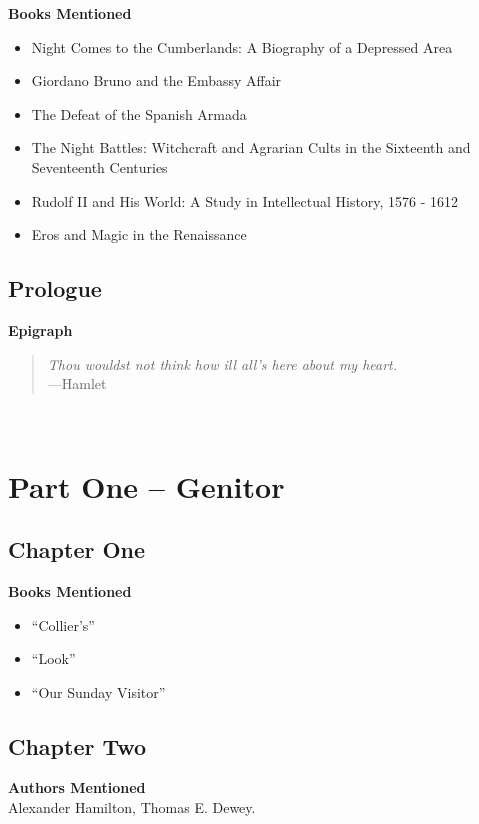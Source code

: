 \documentclass[twoside,10pt]{report}
\newcommand\fleuron{\begin{turn}{45}\Large \ding{166}\end{turn}}
\newcommand\doublefleuron{%
	\reflectbox{\fleuron}\AC\staveXLIX\reflectbox{\AC}\fleuron}
\newcommand\fleuronbar{%
	{\huge\LinearACCCXIII}\xrfill[1.3ex]{1pt}\doublefleuron\xrfill[1.3ex]{1pt}\reflectbox{\huge\LinearACCCXIII}}
\newcommand\nbvspace[1][3]{\vspace*{\stretch{#1}}}
\begin{document}
\textbf{Books Mentioned}
\begin{itemize}
\item Night Comes to the Cumberlands: A Biography of a Depressed Area \cite{Caudill1963}
\item Giordano Bruno and the Embassy Affair \cite{Bossy1991}
\item The Defeat of the Spanish Armada \cite{Mattingly1969}
\item The Night Battles: Witchcraft and Agrarian Cults in the Sixteenth and Seventeenth Centuries \cite{Ginzburg1985}
\item Rudolf II and His World: A Study in Intellectual History, 1576 - 1612 \cite{Evans1973}
\item Eros and Magic in the Renaissance \cite{Culianu1987}
\end{itemize}

\section{Prologue}
\textbf{Epigraph}

\begin{quote}
\textit{Thou wouldst not think how ill all's here about my heart.}\\
---Hamlet
\end{quote}
\begin{center}
\vfill
\shadowoffset{1pt}
\shadowtext{%
{\color{Mahogany}\fontsize{50}{54}\staveLX}}\\
\nbvspace[1]
\end{center}

\chapter{Part One -- Genitor}
\section{Chapter One}
\textbf{Books Mentioned}\\
\begin{itemize}
\item ``Collier’s'' \cite{1952b}
\item ``Look'' \cite{1952}
\item ``Our Sunday Visitor'' \cite{1952a}
\end{itemize}

\section{Chapter Two}
\textbf{Authors Mentioned}\\
Alexander Hamilton, Thomas E. Dewey.
\end{document}
